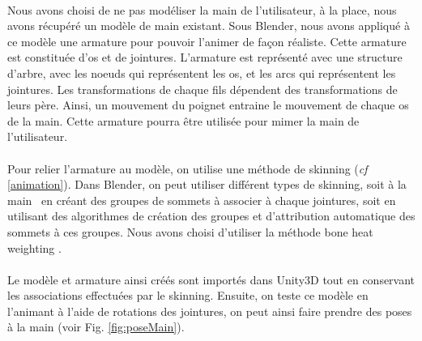 \paragraph{}
Nous avons choisi de ne pas modéliser la main de l'utilisateur, à la place, nous avons récupéré un modèle de main existant.
Sous Blender, nous avons appliqué à ce modèle une armature pour pouvoir l'animer de façon réaliste. Cette armature est constituée d'os et de jointures. L'armature est représenté avec une structure 
d'arbre, avec les noeuds qui représentent les os, et les arcs qui représentent les jointures. Les transformations de chaque fils dépendent des transformations de leurs père. Ainsi, un mouvement du poignet 
entraine le mouvement de chaque os de la main. Cette armature pourra être utilisée pour mimer la main de l'utilisateur. 

\paragraph{}
Pour relier l'armature au modèle, on utilise une méthode de \og skinning \fg (\textit{cf} \ref{animation}). Dans Blender, on peut utiliser différent types de skinning, 
soit \og à la main \fg \ en créant des groupes de sommets à associer à chaque jointures, soit en utilisant des algorithmes de création des groupes et d'attribution automatique des 
sommets à ces groupes. Nous avons choisi d'utiliser la méthode \og bone heat weighting \fg \cite{baran2007automatic}. 

\paragraph{}
Le modèle et armature ainsi créés sont importés dans Unity3D tout en conservant les associations effectuées par le skinning. 
Ensuite, on teste ce modèle en l'animant à l'aide de rotations des jointures, on peut ainsi faire prendre des poses à la main (voir Fig. \ref{fig:poseMain}). 

